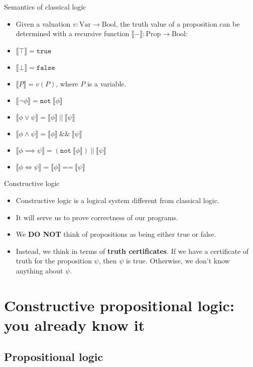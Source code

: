 \documentclass{beamer}
\newcommand{\m}[1]{\texttt{#1}}
\newcommand{\true}{\m{true}}
\newcommand{\false}{\m{false}}
\newcommand{\mnotb}[1]{\m{not}\ #1}
\newcommand{\mandb}[2]{#1\ \m{\&\&}\ #2}
\newcommand{\morb}[2]{#1\ \m{||}\ #2}
\newcommand{\sem}[1]{\llbracket #1 \rrbracket}
\begin{document}
\begin{frame}{Semantics of classical logic}
\begin{itemize}
	\item Given a valuation $v : \text{Var} \to \text{Bool}$, the truth value of a proposition can be determined with a recursive function $\sem{-} : \text{Prop} \to \text{Bool}$:
	\item $\sem{\top} = \true$
	\item $\sem{\bot} = \false$
	\item $\sem{P} = v(P)$, where $P$ is a variable.
	\item $\sem{\neg \phi} = \mnotb{\sem{\phi}}$
	\item $\sem{\phi \lor \psi} = \morb{\sem{\phi}}{\sem{\psi}}$
	\item $\sem{\phi \land \psi} = \mandb{\sem{\phi}}{\sem{\psi}}$
	\item $\sem{\phi \implies \psi} = \morb{(\mnotb{\sem{\phi}})}{\sem{\psi}}$
	\item $\sem{\phi \iff \psi} = \sem{\phi}\ \m{==}\ \sem{\psi}$
\end{itemize}
\end{frame}

\begin{frame}{Constructive logic}
\begin{itemize}
	\item Constructive logic is a logical system different from classical logic.
	\item It will serve us to prove correctness of our programs.
	\item We \textbf{DO NOT} think of propositions as being either true or false.
	\item Instead, we think in terms of \textbf{truth certificates}. If we have a certificate of truth for the proposition $\psi$, then $\psi$ is true. Otherwise, we don't know anything about $\psi$.
\end{itemize}
\end{frame}

\section{Constructive propositional logic: you already know it}

\subsection{Propositional logic}
\end{document}
